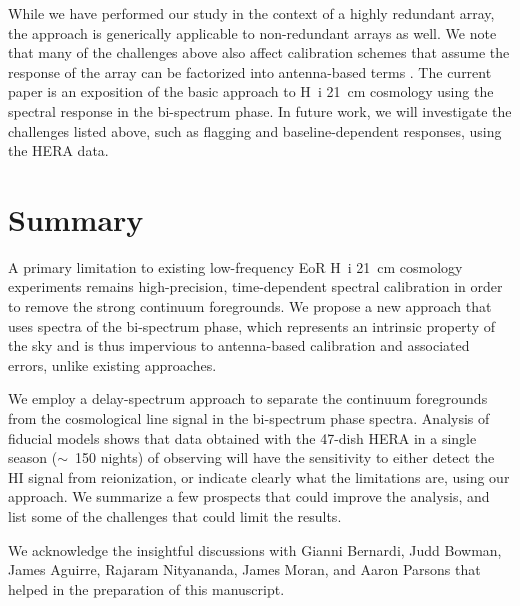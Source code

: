 \documentclass[
reprint,
superscriptaddress,
amsmath,
amssymb,
aps,
prd
]{revtex4-1}
\begin{document}
While we have performed our study in the context of a highly redundant array, the approach is generically applicable to non-redundant arrays as well. We note that many of the challenges above also affect calibration schemes that assume the response of the array can be factorized into antenna-based terms \citep{car18}. The current paper is an exposition of the basic approach to H~{\sc i} 21~cm cosmology using the spectral response in the bi-spectrum phase.  In future work, we will investigate the challenges listed above, such as flagging and baseline-dependent responses, using the HERA data.

\section{Summary}\label{sec:summary}

A primary limitation to existing low-frequency EoR H~{\sc i} 21~cm cosmology experiments remains high-precision, time-dependent spectral calibration in order to remove the strong continuum foregrounds. We propose a new approach that uses spectra of the bi-spectrum phase, which represents an intrinsic property of the sky and is thus impervious to antenna-based calibration and associated errors, unlike existing approaches.
  
We employ a delay-spectrum approach to separate the continuum foregrounds from the cosmological line signal in the bi-spectrum phase spectra. Analysis of fiducial models shows that data obtained with the 47-dish HERA in a single season ($\sim$~150 nights) of observing will have the sensitivity to either detect the HI signal from reionization, or indicate clearly what the limitations are, using our approach.  We summarize a few prospects that could improve the analysis, and list some of the challenges that could limit the results. 

\begin{acknowledgments}
We acknowledge the insightful discussions with Gianni Bernardi, Judd Bowman, James Aguirre, Rajaram Nityananda, James Moran, and Aaron Parsons that helped in the preparation of this manuscript.
\end{acknowledgments}


\end{document}
